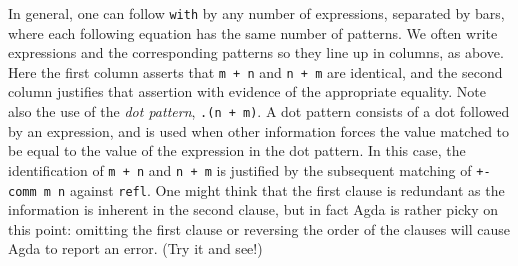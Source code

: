 \begin{fence}
\begin{code}%
\>[0]\AgdaSpace{}%
\AgdaSymbol{:}\AgdaSpace{}%
\AgdaSpace{}%
\AgdaSymbol{(}\AgdaSpace{}%
\AgdaSpace{}%
\AgdaSymbol{:}\AgdaSpace{}%
\AgdaSymbol{)}\<%
\\
\>[0][@{}l@{\AgdaIndent{0}}]%
\>[2]%
\>[473I]\AgdaSpace{}%
\AgdaSymbol{(}\AgdaSpace{}%
\AgdaOperator{\AgdaFunction{+}}\AgdaSpace{}%
\AgdaSymbol{)}\<%
\\
\>[.][@{}l@{}]\<[473I]%
\>[4]\AgdaComment{------------}\<%
\\
%
\>[2]\AgdaSpace{}%
\AgdaSpace{}%
\AgdaSymbol{(}\AgdaSpace{}%
\AgdaOperator{\AgdaFunction{+}}\AgdaSpace{}%
\AgdaSymbol{)}\<%
\\
\>[0]\AgdaSpace{}%
\AgdaSpace{}%
\AgdaSpace{}%
\AgdaSpace{}%
%
\>[25]\AgdaSpace{}%
\AgdaOperator{\AgdaFunction{+}}\AgdaSpace{}%
%
\>[32]\AgdaSymbol{|}\AgdaSpace{}%
\AgdaSpace{}%
\AgdaSpace{}%
\<%
\\
\>[0]%
\>[21]\AgdaSymbol{|}\AgdaSpace{}%
\AgdaSpace{}%
\AgdaDottedPattern{\AgdaOperator{\AgdaFunction{+}}}\AgdaSpace{}%
\AgdaDottedPattern{\AgdaSymbol{)}}\AgdaSpace{}%
\AgdaSymbol{|}\AgdaSpace{}%
%
\>[45]\AgdaSymbol{=}\AgdaSpace{}%
\<%
\end{code}
\end{fence}

In general, one can follow \texttt{with} by any number of expressions,
separated by bars, where each following equation has the same number of
patterns. We often write expressions and the corresponding patterns so
they line up in columns, as above. Here the first column asserts that
\texttt{m\ +\ n} and \texttt{n\ +\ m} are identical, and the second
column justifies that assertion with evidence of the appropriate
equality. Note also the use of the \emph{dot pattern},
\texttt{.(n\ +\ m)}. A dot pattern consists of a dot followed by an
expression, and is used when other information forces the value matched
to be equal to the value of the expression in the dot pattern. In this
case, the identification of \texttt{m\ +\ n} and \texttt{n\ +\ m} is
justified by the subsequent matching of \texttt{+-comm\ m\ n} against
\texttt{refl}. One might think that the first clause is redundant as the
information is inherent in the second clause, but in fact Agda is rather
picky on this point: omitting the first clause or reversing the order of
the clauses will cause Agda to report an error. (Try it and see!)

